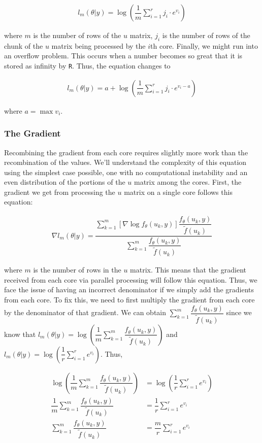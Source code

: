 \documentclass{article}
\begin{document}
\begin{align}
l_m(\theta|y) = \log(\dfrac{1}{m}\sum\limits_{i=1}^r j_i \cdot e^{v_i})
\end{align}

\noindent where $m$ is the number of rows of the $u$ matrix, $j_i$ is the number of rows of the chunk of the $u$ matrix being processed by the $i$th core. Finally, we might run into an overflow problem. This occurs when a number becomes so great that it is stored as infinity by \texttt{R}. Thus, the equation changes to 

\begin{align}
l_m(\theta|y) = a + \log(\dfrac{1}{m}\sum\limits_{i=1}^r j_i \cdot e^{v_i - a})
\end{align}

\noindent where $a = \max{v_i}$.

\subsubsection{The Gradient}
Recombining the gradient from each core requires slightly more work than the recombination of the values. We'll understand the complexity of this equation using the simplest case possible, one with no computational instability and an even distribution of the portions of the $u$ matrix among the cores. First, the gradient we get from processing the $u$ matrix on a single core follows this equation: 

\begin{align}
\nabla l_m(\theta|y)=
\dfrac{\sum_{k=1}^m   \left[  \nabla  \log f_\theta(u_k,y) \right]  \dfrac{f_\theta(u_k,y)}{\tilde{f}(u_k)} }{\sum_{k=1}^m  \dfrac{f_\theta(u_k,y)}{\tilde{f}(u_k)}  } 
\end{align}

\noindent where $m$ is the number of rows in the $u$ matrix. This means that the gradient received from each core via parallel processing will follow this equation. Thus, we face the issue of having an incorrect denominator if we simply add the gradients from each core. To fix this, we need to first multiply the gradient from each core by the denominator of that gradient. We can obtain $\sum_{k=1}^m  \dfrac{f_\theta(u_k,y)}{\tilde{f}(u_k)}$ since we know that $l_{m}(\theta|y) = \log \left( \dfrac{1}{m} \sum_{k=1}^m  \dfrac{ f_\theta(u_k,y)   }{\tilde{f}(u_k)} \right)$ and $l_m(\theta|y) = \log(\dfrac{1}{r}\sum\limits_{i=1}^r e^{v_i})$. Thus, 

\begin{align}
\log \left( \dfrac{1}{m} \sum_{k=1}^m  \dfrac{ f_\theta(u_k,y)   }{\tilde{f}(u_k)} \right) &= \log(\dfrac{1}{r}\sum\limits_{i=1}^r e^{v_i}) \\
\dfrac{1}{m} \sum_{k=1}^m  \dfrac{ f_\theta(u_k,y)   }{\tilde{f}(u_k)}  &= \dfrac{1}{r}\sum\limits_{i=1}^r e^{v_i} \\
\sum_{k=1}^m  \dfrac{ f_\theta(u_k,y)   }{\tilde{f}(u_k)}  &= \dfrac{m}{r} \sum\limits_{i=1}^r e^{v_i}
\end{align}
\end{document}
